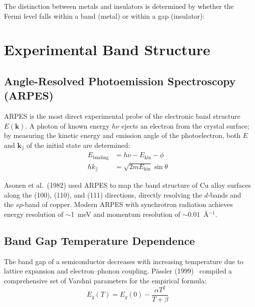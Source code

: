 The distinction between metals and insulators is determined by whether the Fermi level falls within a band (metal) or within a gap (insulator):

\section{Experimental Band Structure}

\subsection{Angle-Resolved Photoemission Spectroscopy (ARPES)}

ARPES is the most direct experimental probe of the electronic band structure $E()$. A photon of known energy $h\nu$ ejects an electron from the crystal surface; by measuring the kinetic energy and emission angle of the photoelectron, both $E$ and $_\parallel$ of the initial state are determined:
\begin{align}
  E_{\text{binding}} &= h\nu - E_{\text{kin}} - \phi \\
  \hbar k_\parallel &= \sqrt{2m E_{\text{kin}}} \sin\theta
\end{align}

Asonen et al.\ (1982) used ARPES to map the band structure of Cu alloy surfaces along the (100), (110), and (111) directions, directly resolving the $d$-bands and the $sp$-band of copper. Modern ARPES with synchrotron radiation achieves energy resolution of $\sim$\SI{1}{\milli\electronvolt} and momentum resolution of $\sim 0.01$~\AA{}$^{-1}$.

\subsection{Band Gap Temperature Dependence}

The band gap of a semiconductor decreases with increasing temperature due to lattice expansion and electron--phonon coupling. P\"assler (1999)~\cite{passler1999bandgap} compiled a comprehensive set of Varshni parameters for the empirical formula:
\begin{equation}
  E_g(T) = E_g(0) - \frac{\alpha T^2}{T + \beta}
\end{equation}

